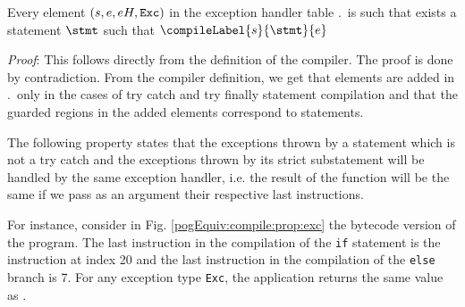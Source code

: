 \begin{compProp7}\label{compile:prop:compProp7}
Every element  $ (s,e, eH, \mbox{\rm\texttt{Exc}} )$  in the exception handler table \methodd.\excHandlerTable  \
  is such that exists a statement $\stmt$ such that $\compileLabel{s}{\stmt}{e}$


\end{compProp7} 
\textit{Proof}:
This follows directly from the definition of the compiler. 
The proof is done by contradiction. From the compiler definition, we get that  elements are added in 
 \methodd.\excHandlerTable \ only in the cases of 
try catch and try finally statement compilation and that the guarded regions in the added elements correspond to statements. \\
\Qed






The following property states that the exceptions thrown by a 
statement which is not a try catch and the  exceptions thrown by its strict substatement
will be handled by the same exception handler, i.e. the result of the function \findExcHandler{*}{*}{*} will be the same 
if we pass as an argument their respective last instructions.

 For instance, consider in Fig. \ref{pogEquiv:compile:prop:exc} 
the bytecode version of the program. The last  instruction in the compilation of the \lstinline!if! statement is the 
instruction at index 20 and the last instruction in the compilation of the \lstinline!else! branch is 7. 
For any exception type \mbox{\rm\tt{Exc}}, the application  returns the same value  as
\findExcHandler{\mbox{\rm\tt{Exc}} }{7}{\lstinline!abs!.\ExcHandler}. 

